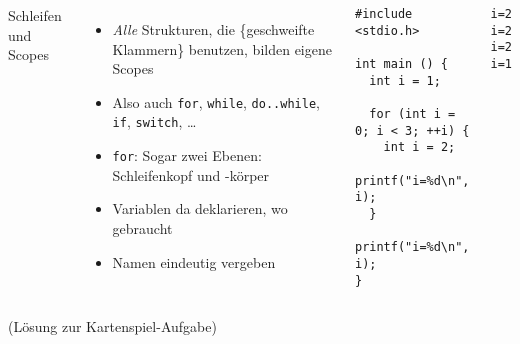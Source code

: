 \begin{frame}[fragile]
%
\begin{columns}[T]
\begin{Large}
{Schleifen und Scopes}
\vspace{6pt}
\end{Large}
%
\begin{itemize}
\item \emph{Alle} Strukturen, die \{geschweifte Klammern\} benutzen, bilden eigene Scopes
\item Also auch \texttt{for}, \texttt{while}, \texttt{do..while},
	  \texttt{if}, \texttt{switch}, \ldots
\item \texttt{for}: Sogar zwei Ebenen: Schleifenkopf und -körper
\item Variablen da deklarieren, wo gebraucht
\item Namen eindeutig vergeben
\end{itemize}
%
\vspace{-10pt}
\begin{codebox}
\begin{verbatim}
#include <stdio.h>

int main () {
  int i = 1;
  
  for (int i = 0; i < 3; ++i) {
    int i = 2;
    printf("i=%d\n", i);
  }
  printf("i=%d\n", i);
}
\end{verbatim}
\end{codebox}
%
\begin{cmdbox}[Ausgabe]
\begin{verbatim}
i=2
i=2
i=2
i=1
\end{verbatim}
\end{cmdbox}
%
\end{columns}
%
\end{frame}


\begin{frame}[fragile]
%
(Lösung zur Kartenspiel-Aufgabe)
%
\end{frame}

